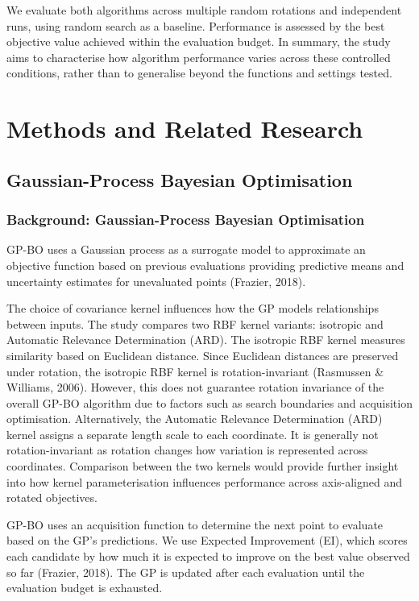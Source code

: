 \documentclass[11pt]{article}
\begin{document}
We evaluate both algorithms across multiple random rotations and independent runs, using random search as a baseline. Performance is assessed by the best objective value achieved within the evaluation budget. In summary, the study aims to characterise how algorithm performance varies across these controlled conditions, rather than to generalise beyond the functions and settings tested.

\section{Methods and Related Research}

\subsection{Gaussian-Process Bayesian Optimisation}

\subsubsection{Background: Gaussian-Process Bayesian Optimisation}

GP-BO uses a Gaussian process as a surrogate model to approximate an objective function based on previous evaluations providing predictive means and uncertainty estimates for unevaluated points (Frazier, 2018). 

The choice of covariance kernel influences how the GP models relationships between inputs. The study compares two RBF kernel variants: isotropic and Automatic Relevance Determination (ARD). The isotropic RBF kernel measures similarity based on Euclidean distance. Since Euclidean distances are preserved under rotation, the isotropic RBF kernel is rotation-invariant (Rasmussen \& Williams, 2006). However, this does not guarantee rotation invariance of the overall GP-BO algorithm due to factors such as search boundaries and acquisition optimisation. Alternatively, the Automatic Relevance Determination (ARD) kernel assigns a separate length scale to each coordinate. It is generally not rotation-invariant as rotation changes how variation is represented across coordinates. Comparison between the two kernels would provide further insight into how kernel parameterisation influences performance across axis-aligned and rotated objectives.

GP-BO uses an acquisition function to determine the next point to evaluate based on the GP’s predictions. We use Expected Improvement (EI), which scores each candidate by how much it is expected to improve on the best value observed so far (Frazier, 2018). The GP is updated after each evaluation until the evaluation budget is exhausted.
\end{document}
